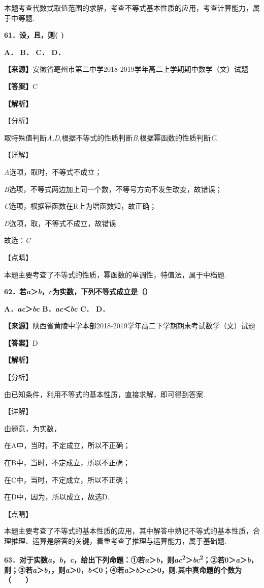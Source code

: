 本题考查代数式取值范围的求解，考查不等式基本性质的应用，考查计算能力，属于中等题.

\textbf{61．设，且，则( )}

\textbf{A． B． C． D．}

\textbf{【来源】}安徽省亳州市第二中学2018-2019学年高二上学期期中数学（文）试题

\textbf{【答案】}C

\textbf{【解析】}

【分析】

取特殊值判断\emph{A,D},根据不等式的性质判断\emph{B},根据幂函数的性质判断\emph{C}.

【详解】

\emph{A}选项，取时，不等式不成立；

\emph{B}选项，不等式两边加上同一个数，不等号方向不发生改变，故错误；

\emph{C}选项，根据幂函数在R上为增函数知，故正确；

\emph{D}选项，取，不等式不成立，故错误.

故选：\emph{C}

【点睛】

本题主要考查了不等式的性质，幂函数的单调性，特值法，属于中档题.

\textbf{62．若\emph{a}＞\emph{b}，\emph{c}为实数，下列不等式成立是（）}

\textbf{A．\emph{ac}＞\emph{bc} B．\emph{ac}＜\emph{bc} C． D．}

\textbf{【来源】}陕西省黄陵中学本部2018-2019学年高二下学期期末考试数学（文）试题

\textbf{【答案】}D

\textbf{【解析】}

【分析】

由已知条件，利用不等式的基本性质，直接求解，即可得到答案.

【详解】

由题意，为实数，

在A中，当时，不定成立，所以不正确；

在B中，当时，不定成立，所以不正确；

在C中，当时，不定成立，所以不正确；

在D中，因为，所以成立，故选D.

【点睛】

本题主要考查了不等式的基本性质的应用，其中解答中熟记不等式的基本性质，合理推理、运算是解答的关键，着重考查了推理与运算能力，属于基础题.

\textbf{63．对于实数\emph{a}，\emph{b}，\emph{c}，给出下列命题：①若\emph{a}＞\emph{b}，则\emph{ac}\textsuperscript{2}＞\emph{bc}\textsuperscript{2}；②若0＞\emph{a}＞\emph{b}，则；③若\emph{a}＞\emph{b}，，则\emph{a}＞0，\emph{b}＜0；④若\emph{a}＞\emph{b}＞\emph{c}＞0，则.其中真命题的个数为（　　）}

